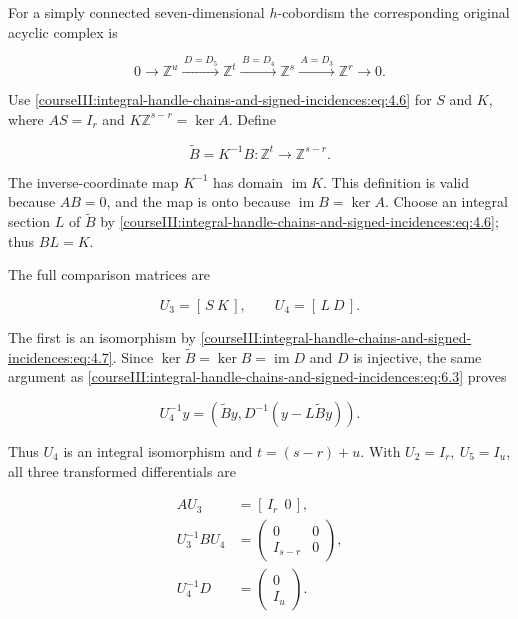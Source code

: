 For a simply connected seven-dimensional \(h\)-cobordism the corresponding original acyclic complex is

\begin{equation}
0\longrightarrow\mathbb Z^u
 \xrightarrow{\,D=D_5\,}\mathbb Z^t
 \xrightarrow{\,B=D_4\,}\mathbb Z^s
 \xrightarrow{\,A=D_3\,}\mathbb Z^r
 \longrightarrow0.
 \label{courseIII:integral-handle-chains-and-signed-incidences:eq:6.7}
\end{equation}

Use \eqref{courseIII:integral-handle-chains-and-signed-incidences:eq:4.6} for \(S\) and \(K\), where \(AS=I_r\) and \(K\mathbb Z^{s-r}=\ker A\). Define

\begin{equation}
\widetilde B=K^{-1}B:\mathbb Z^t\longrightarrow\mathbb Z^{s-r}.
 \label{courseIII:integral-handle-chains-and-signed-incidences:eq:6.8}
\end{equation}

The inverse-coordinate map \(K^{-1}\) has domain \(\operatorname{im}K\). This definition is valid because \(AB=0\), and the map is onto because \(\operatorname{im}B=\ker A\). Choose an integral section \(L\) of \(\widetilde B\) by \eqref{courseIII:integral-handle-chains-and-signed-incidences:eq:4.6}; thus \(BL=K\).

The full comparison matrices are

\begin{equation}
U_3=[\,S\ K\,],\qquad U_4=[\,L\ D\,].
 \label{courseIII:integral-handle-chains-and-signed-incidences:eq:6.9}
\end{equation}

The first is an isomorphism by \eqref{courseIII:integral-handle-chains-and-signed-incidences:eq:4.7}. Since \(\ker\widetilde B=\ker B=\operatorname{im}D\) and \(D\) is injective, the same argument as \eqref{courseIII:integral-handle-chains-and-signed-incidences:eq:6.3} proves

\begin{equation}
U_4^{-1}y=(\widetilde By,D^{-1}(y-L\widetilde By)).
 \label{courseIII:integral-handle-chains-and-signed-incidences:eq:6.10}
\end{equation}

Thus \(U_4\) is an integral isomorphism and \(t=(s-r)+u\). With \(U_2=I_r,\ U_5=I_u\), all three transformed differentials are

\begin{equation}
\begin{aligned}
 AU_3&=[\,I_r\ \ 0\,],\\
 U_3^{-1}BU_4&=\begin{pmatrix}0&0\\I_{s-r}&0\end{pmatrix},\\
 U_4^{-1}D&=\begin{pmatrix}0\\I_u\end{pmatrix}.
 \end{aligned}
 \label{courseIII:integral-handle-chains-and-signed-incidences:eq:6.11}
\end{equation}

